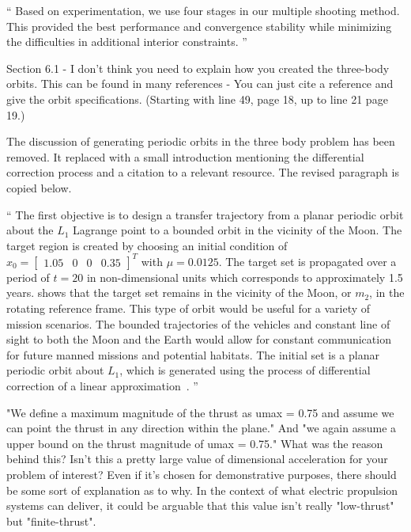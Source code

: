 \documentclass[11pt]{article}
\newenvironment{correction}{\begin{list}{}{\setlength{\leftmargin}{1cm}\setlength{\rightmargin}{1cm}}\vspace{\parsep}\item[]``}{''\end{list}}
\begin{document}
\begin{enumerate}
\begin{correction}
Based on experimentation, we use four stages in our multiple shooting method.
This provided the best performance and convergence stability while minimizing the difficulties in additional interior constraints.
\end{correction}


\item 
    \begin{itshape}
Section 6.1 - I don't think you need to explain how you created the three-body orbits.  This can be found in many references - You can just cite a reference and give the orbit specifications.  (Starting with line 49, page 18, up to line 21 page 19.)
\end{itshape}

The discussion of generating periodic orbits in the three body problem has been removed.
It replaced with a small introduction mentioning the differential correction process and a citation to a relevant resource. 
The revised paragraph is copied below.

\begin{correction}
The first objective is to design a transfer trajectory from a planar periodic orbit about the \( L_1\) Lagrange point to a bounded orbit in the vicinity of the Moon.
The target region is created by choosing an initial condition of \( x_0 = \begin{bmatrix}1.05 & 0 & 0 & 0.35 \end{bmatrix}^T \) with \( \mu = 0.0125 \).
The target set is propagated over a period of \( t = \num{20} \) in non-dimensional units which corresponds to approximately \num{1.5} years.
 shows that the target set remains in the vicinity of the Moon, or \( m_2\), in the rotating reference frame. 
This type of orbit would be useful for a variety of mission scenarios.
The bounded trajectories of the vehicles and constant line of sight to both the Moon and the Earth would allow for constant communication for future manned missions and potential habitats.
The initial set is a planar periodic orbit about \( L_1\), which is generated using the process of differential correction of a linear approximation~\cite{koon2011}.
\end{correction}

\item
    \begin{itshape}
"We define a maximum magnitude of the thrust as umax = 0.75 and assume we can point the thrust in any direction within the plane." And  "we again assume a upper bound on the thrust magnitude of umax = 0.75."  What was the reason behind this? Isn't this a pretty large value of dimensional acceleration for your problem of interest?  Even if it's chosen for demonstrative purposes, there should be some sort of explanation as to why.  In the context of what electric propulsion systems can deliver, it could be arguable that this value isn't really "low-thrust" but "finite-thrust".
\end{itshape}


\end{enumerate}
\end{document}
